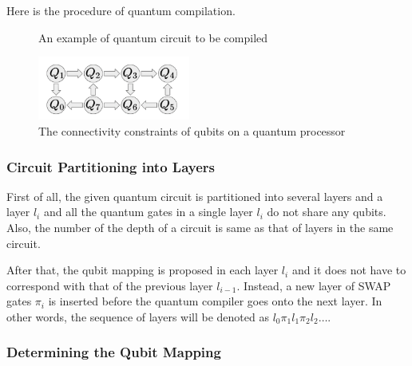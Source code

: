  Here is the procedure of quantum compilation.   
  \begin{figure}[ht]
  	\begin{center}

		\caption{An example of quantum circuit to be compiled}
	\end{center}
\end{figure}

  \begin{figure}[ht]
  	\begin{center}
  		\includegraphics[width=5cm]{img/quantum-processor.png}
		\caption{The connectivity constraints of qubits on a quantum processor}
	\end{center}
\end{figure}
	
 
\subsubsection{Circuit Partitioning into Layers}

 First of all, the given quantum circuit is partitioned into several layers and a layer $l_i$ and all the quantum gates in a single layer $l_i$ do not share any qubits. Also, the number of the depth of a circuit is same as that of layers in the same circuit.
 
 After that, the qubit mapping is proposed in each layer $l_i$ and it does not have to correspond with that of the previous layer  $l_{i-1}$. Instead, a new layer of SWAP gates $\pi_i$ is inserted before the quantum compiler goes onto the next layer. In other words, the sequence of layers will be denoted as $l_0 \pi_1 l_1\pi_2 l_2 \dots$.
 
\subsubsection{Determining the Qubit Mapping}

